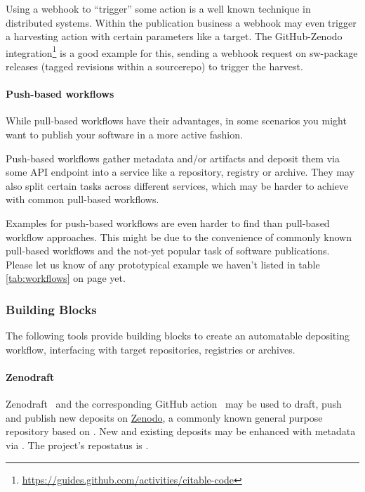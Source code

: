 \documentclass[11pt,a4paper]{scrartcl}
\begin{document}
Using a \gls{webhook} to \enquote{trigger} some action is a well known technique in distributed systems. 
Within the publication business a webhook may even trigger a harvesting action with certain parameters like a target.
The GitHub-Zenodo integration\footnote{\url{https://guides.github.com/activities/citable-code}} is a good example for this,
sending a webhook request on \gls{sw-package} releases (tagged revisions within a \gls{sourcerepo}) to trigger the harvest.

\paragraph{Push-based workflows}\label{par:workflows-push}
While pull-based workflows have their advantages, in some scenarios you might want to publish your software in a more active fashion.

Push-based workflows gather metadata and/or artifacts and deposit them via some API endpoint into a service like a repository,
registry or archive. They may also split certain tasks across different services, which may be harder to achieve with
common pull-based workflows.

Examples for push-based workflows are even harder to find than pull-based workflow approaches. This might be due to the
convenience of commonly known pull-based workflows and the not-yet popular task of software publications. Please let us
know of any prototypical example we haven’t listed in table \ref{tab:workflows} on page \pageref{tab:workflows} yet.


\subsubsection*{Building Blocks}\label{subsubsec:workflows-blocks}
The following tools provide building blocks to create an automatable depositing workflow, interfacing with target repositories, registries or archives.

\paragraph{Zenodraft}\label{par:workflows-zenodraft}
Zenodraft~\cite{sw:zenodraft} and the corresponding GitHub action~\cite{sw:zenodraft-action} may be used to draft, push and publish
new deposits on \href{https://zenodo.org}{Zenodo}, a commonly known general purpose repository based on .
New and existing deposits may be enhanced with metadata via .
The project's \gls{repostatus} is .
\end{document}
